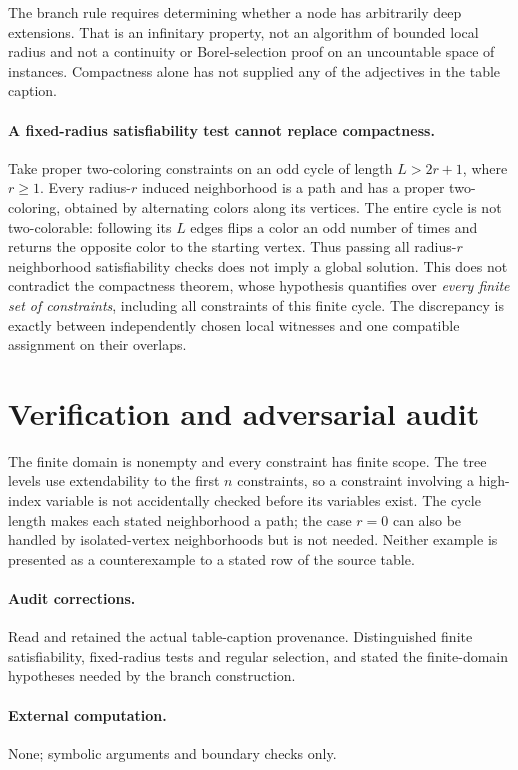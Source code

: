 \documentclass[11pt]{article}
\begin{document}
The branch rule requires determining whether a node has arbitrarily deep
extensions. That is an infinitary property, not an algorithm of bounded local
radius and not a continuity or Borel-selection proof on an uncountable space
of instances. Compactness alone has not supplied any of the adjectives in the
table caption.

\paragraph{A fixed-radius satisfiability test cannot replace compactness.}
Take proper two-coloring constraints on an odd cycle of length $L>2r+1$,
where $r\geq1$. Every radius-$r$ induced neighborhood is a path and has a
proper two-coloring, obtained by alternating colors along its vertices.
The entire cycle is not two-colorable: following its $L$ edges flips a color
an odd number of times and returns the opposite color to the starting vertex.
Thus passing all radius-$r$ neighborhood satisfiability checks does not imply
a global solution. This does not contradict the compactness theorem, whose
hypothesis quantifies over \emph{every finite set of constraints}, including
all constraints of this finite cycle.
The discrepancy is exactly between independently chosen local witnesses and
one compatible assignment on their overlaps.

\section{Verification and adversarial audit}

The finite domain is nonempty and every constraint has finite scope. The tree
levels use extendability to the first $n$ constraints, so a constraint involving
a high-index variable is not accidentally checked before its variables exist.
The cycle length makes each stated neighborhood a path; the case $r=0$ can
also be handled by isolated-vertex neighborhoods but is not needed. Neither
example is presented as a counterexample to a stated row of the source table.

\paragraph{Audit corrections.} Read and retained the actual table-caption provenance. Distinguished
finite satisfiability, fixed-radius tests and regular selection, and stated the
finite-domain hypotheses needed by the branch construction.
\paragraph{External computation.} None; symbolic arguments and boundary checks only.
\end{document}
